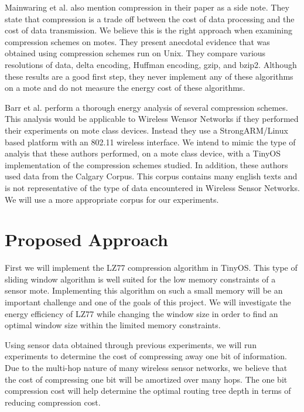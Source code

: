 \documentclass[10pt]{article}
\begin{document}
Mainwaring et al. \cite{habitat} also mention compression in their
paper as a side note. They state that compression is a trade off
between the cost of data processing and the cost of data
transmission. We believe this is the right approach when examining
compression schemes on motes. They present anecdotal evidence that was
obtained using compression schemes run on Unix. They compare various
resolutions of data, delta encoding, Huffman encoding, gzip, and
bzip2. Although these results are a good first step, they never
implement any of these algorithms on a mote and do not measure the
energy cost of these algorithms. 

Barr et al. \cite{energyaware} perform a thorough energy analysis of
several compression schemes. This analysis would be applicable to
Wireless Wensor Networks if they performed their experiments on mote
class devices. Instead they use a StrongARM/Linux based platform with
an 802.11 wireless interface. We intend to mimic the type of analyis
that these authors performed, on a mote class device, with a TinyOS
implementation of the compression schemes studied. In addition, these
authors used data from the Calgary Corpus. This corpus contains many
english texts and is not representative of the type of data
encountered in Wireless Sensor Networks. We will use a more
appropriate corpus for our experiments.

\section{Proposed Approach} 

First we will implement the LZ77 \cite{lz77} compression algorithm in
TinyOS. This type of sliding window algorithm is well suited for the
low memory constraints of a sensor mote. Implementing this algorithm
on such a small memory will be an important challenge and one of the
goals of this project. We will investigate the energy efficiency of
LZ77 while changing the window size in order to find an optimal window
size within the limited memory constraints.

Using sensor data obtained through previous experiments, we will run
experiments to determine the cost of compressing away one bit of
information. Due to the multi-hop nature of many wireless sensor
networks, we believe that the cost of compressing one bit will be
amortized over many hops. The one bit compression cost will help
determine the optimal routing tree depth in terms of reducing
compression cost. 
\end{document}
